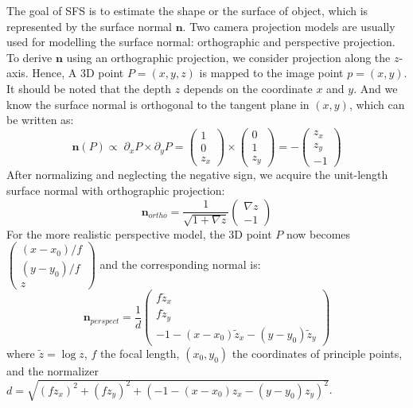 The goal of SFS is to estimate the shape or the surface of object, which is represented by the surface normal $\mathbf{n}$.
Two camera projection models are usually used for modelling the surface normal: orthographic and perspective projection.
To derive $\mathbf{n}$ using an orthographic projection, we consider projection along the $z$-axis\cite{hartley2003multiple}.
Hence, A 3D point $P = (x,y,z)$ is mapped to the image point $p = (x,y)$.
It should be noted that the depth $z$ depends on the coordinate $x$ and $y$.
And we know the surface normal is orthogonal to the tangent plane in $(x,y)$, which can be written as:
\begin{equation}
    \mathbf{n}(P) \propto \; \partial_x P \times \partial_y P 
    = \begin{pmatrix} 1 \\ 0 \\ z_x\end{pmatrix}
    \times \begin{pmatrix} 0 \\ 1 \\ z_y\end{pmatrix}
    = -\begin{pmatrix} z_x \\ z_y \\ -1\end{pmatrix}
\end{equation}
After normalizing and neglecting the negative sign, we acquire the unit-length surface normal with orthographic projection:
\begin{equation}
    \mathbf{n}_{ortho} = \frac{1}{\sqrt{1 + \nabla z}} \begin{pmatrix} \nabla z \\ -1\end{pmatrix}
\end{equation}
For the more realistic perspective model, the 3D point $P$ now becomes $\begin{pmatrix} (x - x_0)/f \\ (y - y_0)/f\\ z\end{pmatrix}$ and the corresponding normal is:
\begin{equation}\label{eq:ratio_normal}
    \mathbf{n}_{perspect} =
    \frac{1}{d}
     \begin{pmatrix}
         f\tilde{z}_x\\
         f\tilde{z}_y\\
         -1 - (x-x_0)\tilde{z}_x - (y - y_0)\tilde{z}_y
     \end{pmatrix}
\end{equation}
where $\tilde{z} = \log{z}$, $f$ the focal length, $(x_0, y_0)$ the coordinates of principle points, and the normalizer $d =  \sqrt{(fz_x)^2 + (fz_y)^2 + (-1 - (x-x_0)z_x - (y - y_0)z_y)^2}$.

